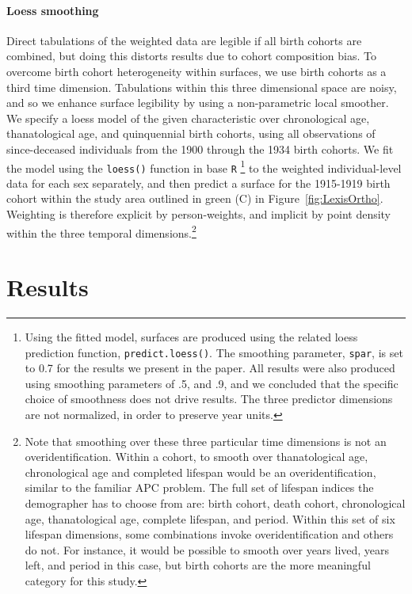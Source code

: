 \documentclass[11pt,oneside]{article} %
\begin{document}
\paragraph*{Loess smoothing}
Direct tabulations of the weighted data are legible if all birth
cohorts are combined, but doing this distorts results due to cohort
composition bias. To overcome birth cohort heterogeneity within surfaces,
we use birth cohorts as a third time dimension. Tabulations within this three dimensional space are noisy, and so we
enhance surface legibility by using a non-parametric local smoother.
We specify a loess model of the given characteristic over chronological age,
thanatological age, and quinquennial birth cohorts, using all observations of since-deceased individuals from the 1900 through the 1934 birth cohorts. We fit the model using the \texttt{loess()} function in base \texttt{R} \citep{cleveland1992local,Rcore2013}\footnote{Using the fitted model, surfaces are produced using the related loess prediction function, \texttt{predict.loess()}. The smoothing parameter, \texttt{spar}, is set to 0.7 for the results we present in the paper.
All results were also produced using smoothing parameters of .5, and .9, and
we concluded that the specific choice of smoothness does not drive results.
The three predictor dimensions are not normalized, in order to preserve year
units. } to the weighted individual-level data for each sex separately, and then
predict a surface for the 1915-1919 birth cohort within the study area outlined
in green (C) in Figure~\ref{fig:LexisOrtho}. Weighting is therefore explicit by
person-weights, and implicit by point density within the three temporal
dimensions.\footnote{Note that smoothing over these three particular time dimensions is not an
overidentification. Within a cohort, to smooth over thanatological age,
chronological age and completed lifespan would be an overidentification, similar
to the familiar APC problem. The full set of lifespan indices the
demographer has to choose from are: birth cohort, death cohort,
chronological age, thanatological age, complete lifespan, and period. Within
this set of six lifespan dimensions, some combinations invoke overidentification
and others do not. For instance, it would be possible to smooth over years
lived, years left, and period in this case, but birth cohorts are the more
meaningful category for this study.}

\section*{Results}
\end{document}
